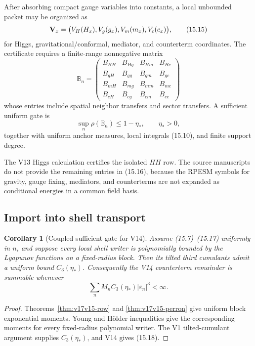 \documentclass[11pt]{article}
\newtheorem{corollary}[theorem]{Corollary}
\theoremstyle{remark}
\begin{document}
After absorbing compact gauge variables into constants, a local
unbounded packet may be organized as
\[
 {\bf V}_x=
 \bigl(V_H(H_x),V_g(g_x),V_m(m_x),V_c(c_x)\bigr),   \tag{15.15}
\]
for Higgs, gravitational/conformal, mediator, and counterterm
coordinates.  The certificate requires a finite-range nonnegative
matrix
\[
 {\mathbb B}_n=
\begin{pmatrix}
B_{HH}&B_{Hg}&B_{Hm}&B_{Hc}\\
B_{gH}&B_{gg}&B_{gm}&B_{gc}\\
B_{mH}&B_{mg}&B_{mm}&B_{mc}\\
B_{cH}&B_{cg}&B_{cm}&B_{cc}
\end{pmatrix}                                      \tag{15.16}
\]
whose entries include spatial neighbor transfers and sector
transfers.  A sufficient uniform gate is
\[
 \sup_n\rho({\mathbb B}_n)\leq1-\eta_*,
 \qquad\eta_*>0,                                   \tag{15.17}
\]
together with uniform anchor measures, local integrals (15.10),
and finite support degree.

The V13 Higgs calculation certifies the isolated \(HH\) row.  The
source manuscripts do not provide the remaining entries in
(15.16), because the RPESM symbols for gravity, gauge fixing,
mediators, and counterterms are not expanded as conditional
energies in a common field basis.

\subsection{Import into shell transport}

\begin{corollary}[Coupled sufficient gate for V14]
\label{cor:v17v15-v14-gate}
Assume (15.7)--(15.17) uniformly in \(n\), and suppose every local
shell writer is polynomially bounded by the Lyapunov functions on a
fixed-radius block.  Then its tilted third cumulants admit a uniform
bound \(C_3(\eta_*)\).  Consequently the V14 counterterm remainder
is summable whenever
\[
 \sum_nM_nC_3(\eta_*)|\varepsilon_n|^3<\infty.      \tag{15.18}
\]
\end{corollary}

\begin{proof}
Theorems~\ref{thm:v17v15-row} and
\ref{thm:v17v15-perron} give uniform block exponential moments.
Young and H\"older inequalities give the corresponding moments for
every fixed-radius polynomial writer.  The V1 tilted-cumulant
argument supplies \(C_3(\eta_*)\), and V14 gives (15.18).
\end{proof}
\end{document}

